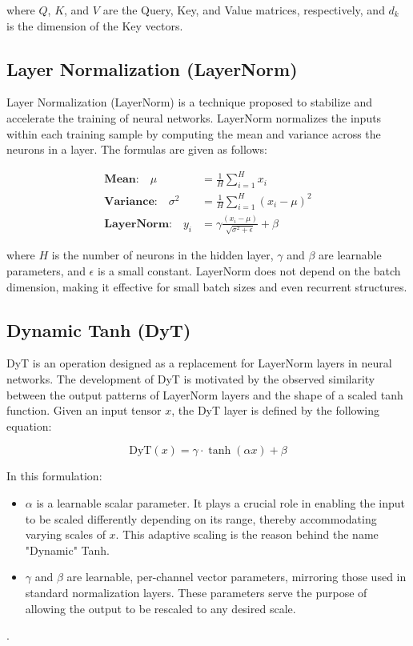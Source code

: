 \documentclass{article}
\begin{document}
where $Q$, $K$, and $V$ are the Query, Key, and Value matrices, respectively, and $d_k$ is the dimension of the Key vectors.

\subsection{Layer Normalization (LayerNorm)}
Layer Normalization (LayerNorm) \cite{ba2016layer} is a technique proposed to stabilize and accelerate the training of neural networks. LayerNorm normalizes the inputs within each training sample by computing the mean and variance across the neurons in a layer. The formulas are given as follows:

\begin{align*}
\textbf{Mean:} \quad \mu &= \frac{1}{H} \sum_{i=1}^{H} x_i \\
\textbf{Variance:} \quad \sigma^2 &= \frac{1}{H} \sum_{i=1}^{H} (x_i - \mu)^2 \\
\textbf{LayerNorm:} \quad  y_i &= \gamma \frac{(x_i - \mu)}{\sqrt{\sigma^2 + \epsilon}} + \beta
\end{align*}

where $H$ is the number of neurons in the hidden layer, $\gamma$ and $\beta$ are learnable parameters, and $\epsilon$ is a small constant. LayerNorm does not depend on the batch dimension, making it effective for small batch sizes and even recurrent structures.

\subsection{Dynamic Tanh (DyT)}
DyT \cite{zhu2025transformers} is an operation designed as a replacement for LayerNorm layers in neural networks. The development of DyT is motivated by the observed similarity between the output patterns of LayerNorm layers and the shape of a scaled tanh function. Given an input tensor $x$, the DyT layer is defined by the following equation:

\begin{equation}
    \text{DyT}(x) = \gamma \cdot \tanh(\alpha x) + \beta
\end{equation}

In this formulation:

\begin{itemize}
    \item $\alpha$ is a learnable scalar parameter. It plays a crucial role in enabling the input to be scaled differently depending on its range, thereby accommodating varying scales of $ x$. This adaptive scaling is the reason behind the name "Dynamic" Tanh.
    \item  $\gamma$ and $\beta$ are learnable, per-channel vector parameters, mirroring those used in standard normalization layers. These parameters serve the purpose of allowing the output to be rescaled to any desired scale.
\end{itemize}.
\end{document}
